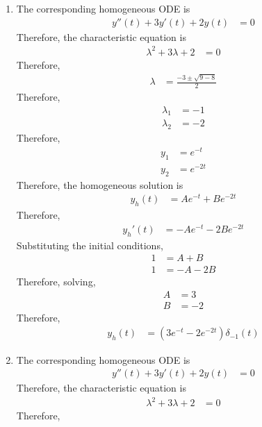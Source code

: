 \documentclass[fleqn, a4paper, 11pt, oneside]{amsart}
\theoremstyle{definition}
\theoremstyle{theorem}
\begin{document}
\begin{solution}
	\begin{enumerate}[leftmargin = *]
		\item
			The corresponding homogeneous ODE is
			\begin{align*}
				y''(t) + 3 y'(t) + 2 y(t) & = 0
			\end{align*}
			Therefore, the characteristic equation is
			\begin{align*}
				\lambda^2 + 3 \lambda + 2 & = 0
			\end{align*}
			Therefore,
			\begin{align*}
				\lambda & = \frac{-3 \pm \sqrt{9 - 8}}{2}
			\end{align*}
			Therefore,
			\begin{align*}
				\lambda_1 & = -1 \\
				\lambda_2 & = -2
			\end{align*}
			Therefore,
			\begin{align*}
				y_1 & = e^{-t} \\
				y_2 & = e^{-2 t}
			\end{align*}
			Therefore, the homogeneous solution is
			\begin{align*}
				y_h(t) & = A e^{-t} + B e^{-2 t}
			\end{align*}
			Therefore,
			\begin{align*}
				{y_h}'(t) & = -A e^{-t} - 2 B e^{-2 t}
			\end{align*}
			Substituting the initial conditions,
			\begin{align*}
				1 & = A + B \\
				1 & = -A - 2 B
			\end{align*}
			Therefore, solving,
			\begin{align*}
				A & = 3 \\
				B & = -2
			\end{align*}
			Therefore,
			\begin{align*}
				y_h(t) & = \left( 3 e^{-t} - 2 e^{-2 t} \right) \delta_{-1}(t)
			\end{align*}
		\item
			The corresponding homogeneous ODE is
			\begin{align*}
				y''(t) + 3 y'(t) + 2 y(t) & = 0
			\end{align*}
			Therefore, the characteristic equation is
			\begin{align*}
				\lambda^2 + 3 \lambda + 2 & = 0
			\end{align*}
			Therefore,

\end{enumerate}
\end{solution}
\end{document}
